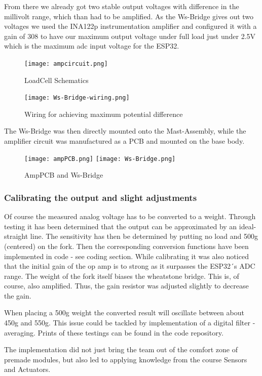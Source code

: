 \documentclass[../report.tex]{subfiles}
\begin{document}
From there we already got two stable output voltages with difference in the millivolt range, 
which than had to be amplified.
As the Ws-Bridge gives out two voltages we used the INA122p instrumentation amplifier and 
configured it with a gain of 308 to have our maximum output voltage under full load just 
under 2.5V which is the maximum adc input voltage for the ESP32.

\begin{figure}[H]
  \centering
  \texttt{[image: ampcircuit.png]}
  \caption{LoadCell Schematics}
\end{figure} 
\begin{figure}[H]
  \centering
  \texttt{[image: Ws-Bridge-wiring.png]}
  \caption{Wiring for achieving maximum potential difference}
\end{figure}

The Ws-Bridge was then directly mounted onto the Mast-Assembly, while the amplifier circuit 
was manufactured as a PCB and mounted on the base body.

\begin{figure}[H]
  \centering
  \texttt{[image: ampPCB.png]}
  \texttt{[image: Ws-Bridge.png]}
  \caption{AmpPCB and Ws-Bridge}
\end{figure} 

\subsubsection{Calibrating the output and slight adjustments}
Of course the measured analog voltage has to be converted to a weight.
Through testing it has been determined that the output can be approximated
by an ideal-straight line. The sensitivity has then be determined by putting no load
and 500g (centered) on the fork. Then the corresponding conversion functions have been 
implemented in code - see coding section.
While calibrating it was also noticed that the initial gain of the op amp is to strong as it 
surpasses the ESP32´s ADC range.
The weight of the fork itself biases the wheatstone bridge. This is, of course, also amplified.
Thus, the gain resistor was adjusted slightly to decrease the gain.

\quad
When placing a 500g weight the converted result will oscillate between about 450g and 550g.
This issue could be tackled by implementation of a digital filter - averaging. Prints of these testings
can be found in the code repository.
\quad

The implementation did not just bring the team out of the comfort zone of premade modules, but
also led to applying knowledge from the course Sensors and Actuators.
\end{document}
